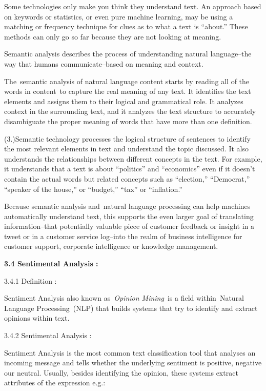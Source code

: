 \documentclass{article} %
\begin{document}
Some technologies only make you think they understand text. An approach based on keywords or statistics, or even pure machine learning, may be using a matching or frequency technique for clues as to what a text is ``about.'' These methods can only go so far because they are not looking at meaning.

Semantic analysis describes the process of understanding natural language--the way that humans communicate--based on meaning and context.

The~semantic analysis of natural language content starts by reading all of the words in content~to capture the real meaning of any text. It identifies the text elements and assigns them to their logical and grammatical role. It analyzes context in the surrounding text, and it analyzes the text structure to accurately disambiguate the proper meaning of words that have more than one definition.

(3.)Semantic technology processes the logical structure of sentences to identify the most relevant elements in text and understand the topic discussed. It also understands the relationships between different concepts in the text. For example, it understands that a text is about ``politics'' and ``economics'' even if it doesn't contain the actual words but related concepts such as ``election,'' ``Democrat,'' ``speaker of the house,'' or ``budget,'' ``tax'' or ``inflation.''

Because semantic analysis and~natural language processing can help machines automatically understand text, this supports the even larger goal of translating information--that potentially valuable piece of customer feedback or insight in a tweet or in a customer service log--into the realm of business intelligence for customer support, corporate intelligence or knowledge management.

\noindent 

\noindent \textbf{3.4 Sentimental Analysis :}

 3.4.1 Definition : 

Sentiment Analysis also known as~\textit{Opinion Mining}~is a field within~Natural Language Processing~(NLP) that builds systems that try to identify and extract opinions within text. 



3.4.2 Sentimental Analysis :

Sentiment Analysis is the most common text classification tool that analyses an incoming message and tells whether the underlying sentiment is positive, negative our neutral. Usually, besides identifying the opinion, these systems extract attributes of the expression e.g.:
\end{document}
